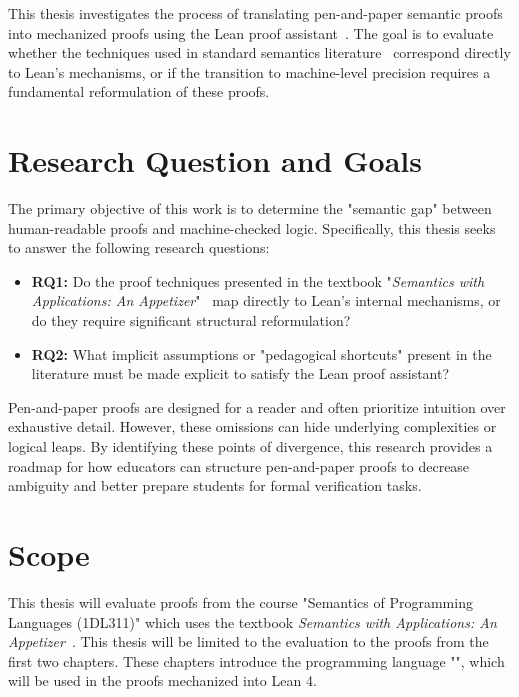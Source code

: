 This thesis investigates the process of translating pen-and-paper
semantic proofs into mechanized proofs using the
Lean proof assistant~\citep{theorem_proving_2026}.
The goal is to evaluate whether the techniques used in standard semantics
literature~\citep{uppsala_reading_2023} correspond directly to Lean's mechanisms,
or if the transition to machine-level precision requires a fundamental
reformulation of these proofs.


%
%
%
\label{intro:research_question}
\section{Research Question and Goals}
The primary objective of this work is to determine the "semantic gap"
between human-readable proofs and machine-checked logic.
Specifically, this thesis seeks to answer the following research questions:
\begin{itemize}
    \item \textbf{RQ1:} Do the proof techniques presented in the textbook "\emph{Semantics with Applications: An Appetizer}"~\citep{nielson_semantics_2007}
    map directly to Lean's internal mechanisms, or do they require significant
    structural reformulation?
    \item \textbf{RQ2:} What implicit assumptions or "pedagogical shortcuts"
    present in the literature must be made explicit to satisfy the Lean proof assistant?
\end{itemize}

\noindent
Pen-and-paper proofs are designed for a reader and often prioritize
intuition over exhaustive detail.
However, these omissions can hide underlying complexities or logical leaps.
By identifying these points of divergence,
this research provides a roadmap for how educators can
structure pen-and-paper proofs to decrease ambiguity and better prepare students
for formal verification tasks.

%
%
%
\section{Scope}
\label{intro:scope}
This thesis will evaluate proofs from the course "Semantics of Programming Languages
(1DL311)" which uses the textbook \emph{Semantics with Applications: An Appetizer}~\citep{nielson_semantics_2007}.
This thesis will be limited to the evaluation to the proofs from the first two chapters.
These chapters introduce the programming language "\While", which will be
used in the proofs mechanized into Lean 4.

